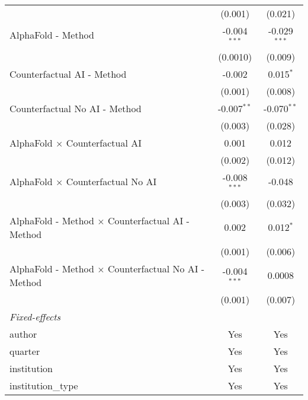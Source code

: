 \begin{tabular}{lcc}
                                                              & (0.001)        & (0.021)\\   
   AlphaFold - Method                                         & -0.004$^{***}$ & -0.029$^{***}$\\   
                                                              & (0.0010)       & (0.009)\\   
   Counterfactual AI - Method                                 & -0.002         & 0.015$^{*}$\\   
                                                              & (0.001)        & (0.008)\\   
   Counterfactual No AI - Method                              & -0.007$^{**}$  & -0.070$^{**}$\\   
                                                              & (0.003)        & (0.028)\\   
   AlphaFold $\times$ Counterfactual AI                       & 0.001          & 0.012\\   
                                                              & (0.002)        & (0.012)\\   
   AlphaFold $\times$ Counterfactual No AI                    & -0.008$^{***}$ & -0.048\\   
                                                              & (0.003)        & (0.032)\\   
   AlphaFold - Method $\times$ Counterfactual AI - Method     & 0.002          & 0.012$^{*}$\\   
                                                              & (0.001)        & (0.006)\\   
   AlphaFold - Method $\times$ Counterfactual No AI - Method  & -0.004$^{***}$ & 0.0008\\   
                                                              & (0.001)        & (0.007)\\   
   \midrule
   \emph{Fixed-effects}\\
   author                                                     & Yes            & Yes\\  
   quarter                                                    & Yes            & Yes\\  
   institution                                                & Yes            & Yes\\  
   institution\_type                                          & Yes            & Yes\\  

\end{tabular}
